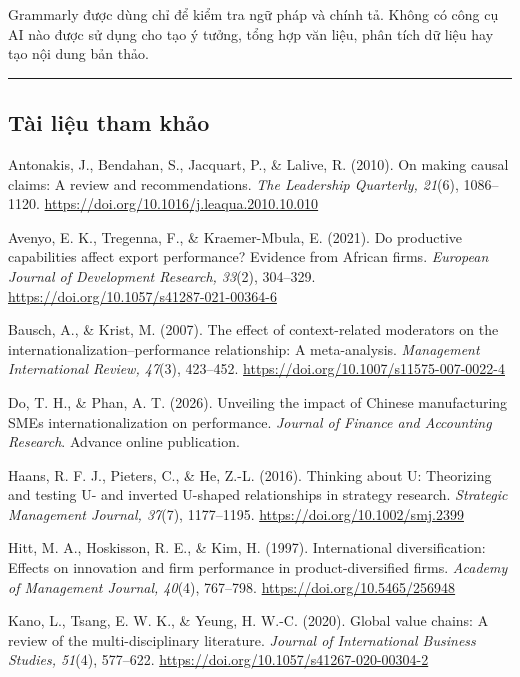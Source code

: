 \documentclass[12pt,a4paper]{article}
\begin{document}
Grammarly được dùng chỉ để kiểm tra ngữ pháp và chính tả. Không có công
cụ AI nào được sử dụng cho tạo ý tưởng, tổng hợp văn liệu, phân tích dữ
liệu hay tạo nội dung bản thảo.

\begin{center}\rule{0.5\linewidth}{0.5pt}\end{center}

\hypertarget{tuxe0i-liux1ec7u-tham-khux1ea3o}{%
\subsection{Tài liệu tham khảo}\label{tuxe0i-liux1ec7u-tham-khux1ea3o}}

Antonakis, J., Bendahan, S., Jacquart, P., \& Lalive, R. (2010). On
making causal claims: A review and recommendations. \emph{The Leadership
Quarterly, 21}(6), 1086--1120.
\url{https://doi.org/10.1016/j.leaqua.2010.10.010}

Avenyo, E. K., Tregenna, F., \& Kraemer-Mbula, E. (2021). Do productive
capabilities affect export performance? Evidence from African firms.
\emph{European Journal of Development Research, 33}(2), 304--329.
\url{https://doi.org/10.1057/s41287-021-00364-6}

Bausch, A., \& Krist, M. (2007). The effect of context-related
moderators on the internationalization--performance relationship: A
meta-analysis. \emph{Management International Review, 47}(3), 423--452.
\url{https://doi.org/10.1007/s11575-007-0022-4}

Do, T. H., \& Phan, A. T. (2026). Unveiling the impact of Chinese
manufacturing SMEs\textquotesingle{} internationalization on
performance. \emph{Journal of Finance and Accounting Research}. Advance
online publication.

Haans, R. F. J., Pieters, C., \& He, Z.-L. (2016). Thinking about U:
Theorizing and testing U- and inverted U-shaped relationships in
strategy research. \emph{Strategic Management Journal, 37}(7),
1177--1195. \url{https://doi.org/10.1002/smj.2399}

Hitt, M. A., Hoskisson, R. E., \& Kim, H. (1997). International
diversification: Effects on innovation and firm performance in
product-diversified firms. \emph{Academy of Management Journal, 40}(4),
767--798. \url{https://doi.org/10.5465/256948}

Kano, L., Tsang, E. W. K., \& Yeung, H. W.-C. (2020). Global value
chains: A review of the multi-disciplinary literature. \emph{Journal of
International Business Studies, 51}(4), 577--622.
\url{https://doi.org/10.1057/s41267-020-00304-2}
\end{document}
